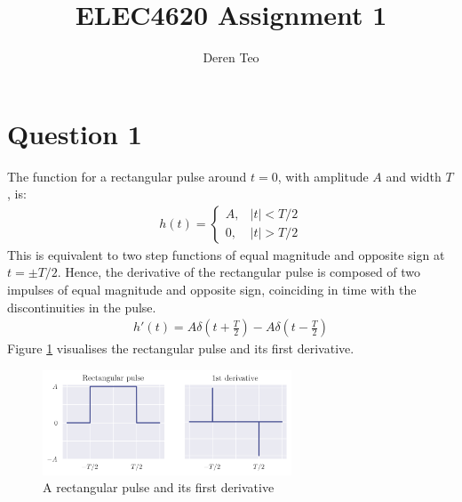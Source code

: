 \documentclass[a4paper, 11pt]{article}
\title{ELEC4620 Assignment 1}
\author{Deren Teo}
\begin{document}
\maketitle

\section*{Question 1}

The function for a rectangular pulse around $t=0$, with amplitude $A$ and width
$T$, is:
\begin{align*}
    h(t) = \begin{cases}
        A, & |t| < T/2 \\
        0, & |t| > T/2
    \end{cases}
\end{align*}
This is equivalent to two step functions of equal magnitude and opposite sign at
$t=\pm T/2$. Hence, the derivative of the rectangular pulse is composed of two
impulses of equal magnitude and opposite sign, coinciding in time with the
discontinuities in the pulse.
\begin{align*}
    h'(t) = A \delta(t+\frac{T}{2}) - A \delta(t-\frac{T}{2})
\end{align*}
Figure \ref{fig:q1_rectangular} visualises the rectangular pulse and its first
derivative.

\begin{figure}[ht]
    \centering
    \includegraphics[width=0.66\textwidth]{images/q1_rectangular.png}
    \caption{A rectangular pulse and its first derivative}
    \label{fig:q1_rectangular}
\end{figure}
\end{document}
